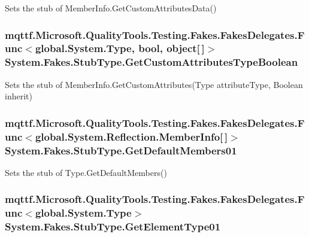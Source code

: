 Sets the stub of Member\-Info.\-Get\-Custom\-Attributes\-Data()

\hypertarget{class_system_1_1_fakes_1_1_stub_type_a42dfffe1099bae685120d9e130f91e0b}{
\subsubsection[{Get\-Custom\-Attributes\-Type\-Boolean}]{\setlength{\rightskip}{0pt plus 5cm}mqttf.\-Microsoft.\-Quality\-Tools.\-Testing.\-Fakes.\-Fakes\-Delegates.\-Func$<$global.\-System.\-Type, bool, object\mbox{[}$\,$\mbox{]}$>$ System.\-Fakes.\-Stub\-Type.\-Get\-Custom\-Attributes\-Type\-Boolean}}\label{class_system_1_1_fakes_1_1_stub_type_a42dfffe1099bae685120d9e130f91e0b}


Sets the stub of Member\-Info.\-Get\-Custom\-Attributes(\-Type attribute\-Type, Boolean inherit)

\hypertarget{class_system_1_1_fakes_1_1_stub_type_a6e409b040acdef41dd1660b140cb5c05}{
\subsubsection[{Get\-Default\-Members01}]{\setlength{\rightskip}{0pt plus 5cm}mqttf.\-Microsoft.\-Quality\-Tools.\-Testing.\-Fakes.\-Fakes\-Delegates.\-Func$<$global.\-System.\-Reflection.\-Member\-Info\mbox{[}$\,$\mbox{]}$>$ System.\-Fakes.\-Stub\-Type.\-Get\-Default\-Members01}}\label{class_system_1_1_fakes_1_1_stub_type_a6e409b040acdef41dd1660b140cb5c05}


Sets the stub of Type.\-Get\-Default\-Members()

\hypertarget{class_system_1_1_fakes_1_1_stub_type_a695ca47eb6937f8e4491de98d2525843}{
\subsubsection[{Get\-Element\-Type01}]{\setlength{\rightskip}{0pt plus 5cm}mqttf.\-Microsoft.\-Quality\-Tools.\-Testing.\-Fakes.\-Fakes\-Delegates.\-Func$<$global.\-System.\-Type$>$ System.\-Fakes.\-Stub\-Type.\-Get\-Element\-Type01}}\label{class_system_1_1_fakes_1_1_stub_type_a695ca47eb6937f8e4491de98d2525843}


